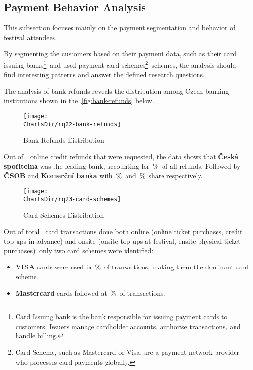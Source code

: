 
\subsection{Payment Behavior Analysis}
\label{subsec:analysis-customer-payment-behavior}
This subsection focuses mainly on the payment segmentation and behavior of festival attendees.

By segmenting the customers based on their payment data,
such as their card issuing banks\footnote{Card Issuing bank is the bank responsible for issuing payment cards to customers. Issuers manage cardholder accounts, authorise transactions, and handle billing\cite{jc_what_are_card_schemes_and_how_do_they_work}.}~and
used payment card schemes\footnote{Card Scheme, such as Mastercard or Visa, are a payment network provider who processes card payments globally\cite{jc_what_are_card_schemes_and_how_do_they_work}.}~schemes,
the analysis should find interesting patterns and answer the defined research questions.


The analysis of bank refunds reveals the distribution among Czech banking institutions shown in the~\autoref{fig:bank-refunds} below.

\begin{figure}[H]
	\centering
	\texttt{[image: \\ChartsDir/rq22-bank-refunds]}
	\caption{ Bank Refunds Distribution}
	\label{fig:bank-refunds}
	\source
\end{figure}

Out of~~online credit refunds that were requested, the data shows that \textbf{Česká spořitelna} was the leading bank, accounting for~\%~of all refunds.
Followed by \textbf{ČSOB} and \textbf{Komerční banka} with~\%~and~\%~share respectively.


\begin{figure}[H]
	\centering
	\texttt{[image: \\ChartsDir/rq23-card-schemes]}
	\caption{ Card Schemes Distribution}
	\label{fig:card-schemes}
	\source
\end{figure}

Out of total ~card transactions done both online (online ticket purchases, credit top-ups in advance) and onsite (onsite top-ups at festival, onsite physical ticket purchases), only two card schemes were identified:
\begin{itemize}
	\item \textbf{VISA} cards were used in~\%~of transactions, making them the dominant card scheme.
	\item \textbf{Mastercard} cards followed at~\%~of transactions.
\end{itemize}

